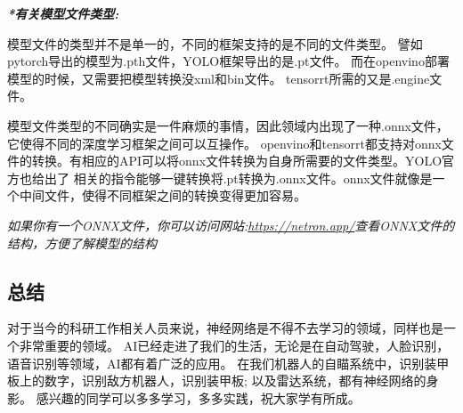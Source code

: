 \textbf{\textit{*有关模型文件类型:}}

模型文件的类型并不是单一的，不同的框架支持的是不同的文件类型。
譬如pytorch导出的模型为.pth文件，YOLO框架导出的是.pt文件。
而在openvino部署模型的时候，又需要把模型转换没xml和bin文件。
tensorrt所需的又是.engine文件。

模型文件类型的不同确实是一件麻烦的事情，因此领域内出现了一种.onnx文件，它使得不同的深度学习框架之间可以互操作。
openvino和tensorrt都支持对onnx文件的转换。有相应的API可以将onnx文件转换为自身所需要的文件类型。YOLO官方也给出了
相关的指令能够一键转换将.pt转换为.onnx文件。onnx文件就像是一个中间文件，使得不同框架之间的转换变得更加容易。

\textit{如果你有一个ONNX文件，你可以访问网站:\url{https://netron.app/}查看ONNX文件的结构，方便了解模型的结构}

\subsection{总结}
对于当今的科研工作相关人员来说，神经网络是不得不去学习的领域，同样也是一个非常重要的领域。
AI已经走进了我们的生活，无论是在自动驾驶，人脸识别，语音识别等领域，AI都有着广泛的应用。
在我们机器人的自瞄系统中，识别装甲板上的数字，识别敌方机器人，识别装甲板; 以及雷达系统，都有神经网络的身影。
感兴趣的同学可以多多学习，多多实践，祝大家学有所成。